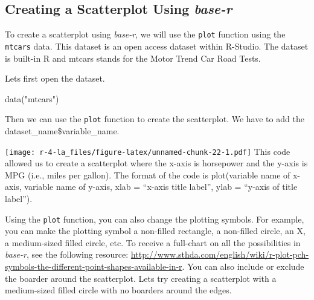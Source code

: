 \documentclass[
]{book}
\newenvironment{Shaded}{\begin{snugshade}}{\end{snugshade}}
\newcommand{\AttributeTok}[1]{\textcolor[rgb]{0.77,0.63,0.00}{#1}}
\newcommand{\FunctionTok}[1]{\textcolor[rgb]{0.00,0.00,0.00}{#1}}
\newcommand{\NormalTok}[1]{#1}
\newcommand{\SpecialCharTok}[1]{\textcolor[rgb]{0.00,0.00,0.00}{#1}}
\newcommand{\StringTok}[1]{\textcolor[rgb]{0.31,0.60,0.02}{#1}}
\begin{document}
\hypertarget{creating-a-scatterplot-using-base-r}{%
\subsection{\texorpdfstring{Creating a Scatterplot Using \emph{base-r}}{Creating a Scatterplot Using base-r}}\label{creating-a-scatterplot-using-base-r}}

To create a scatterplot using \emph{base-r}, we will use the \texttt{plot} function using the \texttt{mtcars} data. This dataset is an open access dataset within R-Studio. The dataset is built-in R and mtcars stands for the Motor Trend Car Road Tests.

Lets first open the dataset.

\begin{Shaded}
\begin{Highlighting}[]
\FunctionTok{data}\NormalTok{(}\StringTok{"mtcars"}\NormalTok{)}
\end{Highlighting}
\end{Shaded}

Then we can use the \texttt{plot} function to create the scatterplot. We have to add the dataset\_name\$variable\_name.

\begin{Shaded}
\end{Shaded}

\texttt{[image: r-4-la\_files/figure-latex/unnamed-chunk-22-1.pdf]}
This code allowed us to create a scatterplot where the x-axis is horsepower and the y-axis is MPG (i.e., miles per gallon). The format of the code is plot(variable name of x-axis, variable name of y-axis, xlab = ``x-axis title label'', ylab = ``y-axis of title label'').

Using the \texttt{plot} function, you can also change the plotting symbols. For example, you can make the plotting symbol a non-filled rectangle, a non-filled circle, an X, a medium-sized filled circle, etc. To receive a full-chart on all the possibilities in \emph{base-r}, see the following resource: \url{http://www.sthda.com/english/wiki/r-plot-pch-symbols-the-different-point-shapes-available-in-r}. You can also include or exclude the boarder around the scatterplot. Lets try creating a scatterplot with a medium-sized filled circle with no boarders around the edges.
\end{document}
